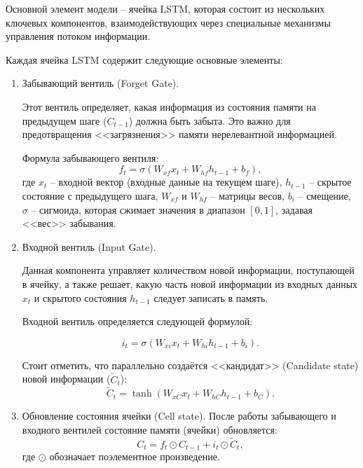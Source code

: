 \documentclass[bachelor, och, coursework]{SCWorks}
\begin{document}
  Основной элемент модели -- ячейка LSTM, которая состоит из нескольких ключевых компонентов, взаимодействующих через специальные механизмы управления 
  потоком информации.

  Каждая ячейка LSTM содержит следующие основные элементы:  

  \begin{enumerate}
    
    \item Забывающий вентиль (Forget Gate).
    
    Этот вентиль определяет, какая информация из состояния памяти на предыдущем шаге ($C_{t-1}$) должна быть забыта.  
    Это важно для предотвращения <<загрязнения>> памяти нерелевантной информацией.  
    
    Формула забывающего вентиля:  
    \begin{equation}      
        f_t = \sigma(W_{xf}x_t + W_{hf}h_{t-1} + b_f),
    \end{equation}
     где $x_t$ -- входной вектор (входные данные на текущем шаге), $h_{t-1}$ -- скрытое состояние с предыдущего шага, $W_{xf}$ и $W_{hf}$ -- матрицы весов,
     $b_i$ -- смещение, $\sigma$ -- сигмоида, которая сжимает значения в диапазон $[0, 1]$, задавая <<вес>> забывания.

    \item Входной вентиль (Input Gate).
    
    Данная компонента управляет количеством новой информации, поступающей в ячейку, а также решает, 
    какую часть новой информации из входных данных \(x_t\) и скрытого состояния \(h_{t-1}\) 
    следует записать в память.

    Входной вентиль определяется следующей формулой:  

    \begin{equation}
        i_t = \sigma(W_{xi}x_t + W_{hi}h_{t-1} + b_i).
    \end{equation}
    
    Стоит отметить, что параллельно создаётся <<кандидат>> (Candidate state) новой информации (\(\tilde{C}_t\)):  
    \begin{equation}
      \tilde{C}_t = \tanh(W_{xC}x_t + W_{hC}h_{t-1} + b_C).      
    \end{equation}

    \item Обновление состояния ячейки (Cell state). 
    После работы забывающего и входного вентилей состояние памяти (ячейки) обновляется:  
    \begin{equation}
        C_t = f_t \odot C_{t-1} + i_t \odot \tilde{C}_t,
    \end{equation}
    где \(\odot\) обозначает поэлементное произведение.  
    

\end{enumerate}
\end{document}
